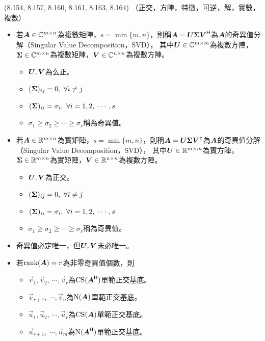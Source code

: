 \item \begin{theorem}{(8.154, 8.157, 8.160, 8.161, 8.163, 8.164)} （正交，方陣，特徵，可逆，解，實數，複數）
	\begin{itemize}
		\item 若$\boldsymbol{A} \in \mathbb{C}^{m \times n}$為複數矩陣，$s = \min\{m, n\}$，則稱$\boldsymbol{A} = \boldsymbol{U\Sigma V}^{\mathsf{H}}$為$\boldsymbol{A}$的奇異值分解（Singular Value Decomposition，SVD），
			其中$\boldsymbol{U} \in \mathbb{C}^{m \times m}$為複數方陣，$\boldsymbol{\Sigma} \in \mathbb{C}^{m \times n}$為複數矩陣，$\boldsymbol{V} \in \mathbb{C}^{n \times n}$為複數方陣。
			\begin{itemize}
				\item $\boldsymbol{U}, \boldsymbol{V}$為么正。
				\item $(\boldsymbol{\Sigma})_{ij} = 0, \ \forall i \neq j$
				\item $(\mat{\Sigma})_{ii} = \sigma_i, \ \forall i = 1, 2, \ \cdots, s$
				\item $\sigma_1 \ge \sigma_2 \ge \cdots \ge \sigma_s$稱為奇異值。
			\end{itemize}
		\item 若$\boldsymbol{A} \in \mathbb{R}^{m \times n}$為實矩陣，$s = \min\{m, n\}$，則稱$\boldsymbol{A} = \boldsymbol{U\Sigma V}^\intercal$為$\boldsymbol{A}$的奇異值分解（Singular Value Decomposition，SVD），
			其中$\boldsymbol{U} \in \mathbb{R}^{m \times m}$為實方陣，$\boldsymbol{\Sigma} \in \mathbb{R}^{m \times n}$為實矩陣，$\boldsymbol{V} \in \mathbb{R}^{n \times n}$為複數方陣。
			\begin{itemize}
				\item $\boldsymbol{U}, \boldsymbol{V}$為正交。
				\item $(\boldsymbol{\Sigma})_{ij} = 0, \ \forall i \neq j$
				\item $(\mat{\Sigma})_{ii} = \sigma_i, \ \forall i = 1, 2, \ \cdots, s$
				\item $\sigma_1 \ge \sigma_2 \ge \cdots \ge \sigma_s$稱為奇異值。
			\end{itemize}
		\item 奇異值必定唯一，但$\boldsymbol{U}, \boldsymbol{V}$未必唯一。
		\item 若$\operatorname{rank}(\boldsymbol{A}) = r$為非零奇異值個數，則
			\begin{itemize}
				\item $\vec{v}_1, \vec{v}_2, \ \cdots, \vec{v}_r$為$\operatorname{CS}(\boldsymbol{A}^{\mathsf{H}})$單範正交基底。
				\item $\vec{v}_{r + 1}, \ \cdots, \vec{v}_n$為$\operatorname{N}(\boldsymbol{A})$單範正交基底。
				\item $\vec{u}_1, \vec{u}_2, \ \cdots, \vec{u}_r$為$\operatorname{CS}(\boldsymbol{A})$單範正交基底。
				\item $\vec{u}_{r + 1}, \ \cdots, \vec{u}_m$為$\operatorname{N}(\boldsymbol{A}^{\mathsf{H}})$單範正交基底。 

\end{itemize}
\end{itemize}
\end{theorem}
